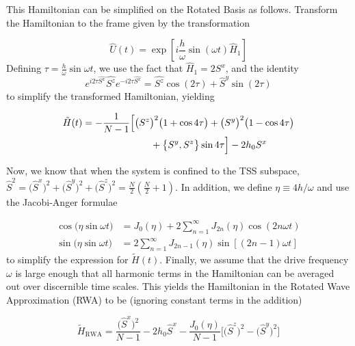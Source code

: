 \documentclass[%
 reprint,
superscriptaddress,
 amsmath,amssymb,
 aps,
prb,
]{revtex4-2}
\begin{document}
This Hamiltonian can be simplified on the Rotated Basis as follows. Transform the Hamiltonian to the frame given by the transformation

\begin{equation}
	\hat{U}(t)=\exp \left[i \frac{h}{\omega} \sin (\omega t) \hat{H}_{1}\right]
\end{equation}
Defining $\tau = \displaystyle\frac{h}{\omega}\sin{\omega t}$, we use the fact that $\hat{H}_1 = 2 S^x$, and the identity  
\begin{equation}
e^{i 2\tau\hat{S^{x}}} \hat{S^{z}} e^{-i 2\tau \hat{S^{x}}}=\hat{S^{z}} \cos \left(2\tau\right)+\hat{S}^{y} \sin \left(2\tau\right)
\end{equation}
to simplify the transformed Hamiltonian, yielding

\begin{align}
	\tilde{H}(t)& = -\frac{1}{N-1}\Big[\big(S^z\big)^2 \big(1+\cos{4\tau}\big)+ \big(S^y\big)^2 \big(1-\cos{4\tau}\big)\nonumber \\  
	&\hskip 2.5cm + \big\{S^y, S^z\big\}\sin{4\tau}\Big] - 2 h_0 S^x
\end{align}


Now, we know that when the system is confined to the TSS subspace,  $\hat{S}^{2}=\big(\hat{S}^x\big)^{2}+\big(\hat{S}^y\big)^{2}+\big(\hat{S}^z\big)^{2}=\frac{N}{2}\left(\frac{N}{2}+1\right)$. In addition, we define $\eta\equiv 4h/\omega$ and use the Jacobi-Anger formulae ~\cite{noauthor_jacobianger_2022}

\begin{align*}
	\cos \big(\eta \sin\omega t\big) &= J_{0}(\eta)+2 \sum_{n=1}^{\infty} J_{2 n}(\eta) \cos (2 n \omega t) \\
	\sin \big(\eta \sin\omega t\big) &= 2 \sum_{n=1}^{\infty} J_{2 n-1}(\eta)\sin [(2 n-1) \omega t]
\end{align*}
to simplify the expression for $\tilde{H}(t)$. Finally, we assume that the drive frequency $\omega$ is large enough that all harmonic terms in the Hamiltonian can be averaged out over discernible time scales. This yields the Hamiltonian in the Rotated Wave Approximation (RWA) to be (ignoring constant terms in the addition)

\begin{equation}
	\tilde{H}_{\mathrm{RWA}}= \frac{\big(\hat{S}^x\big)^{2}}{N-1} - 2h_0 \hat{S}^x - \frac{J_0(\eta)}{N-1}\bigg[\big(\hat{S}^z\big)^{2} - \big(\hat{S}^y\big)^{2} \bigg]
\end{equation}
\end{document}
